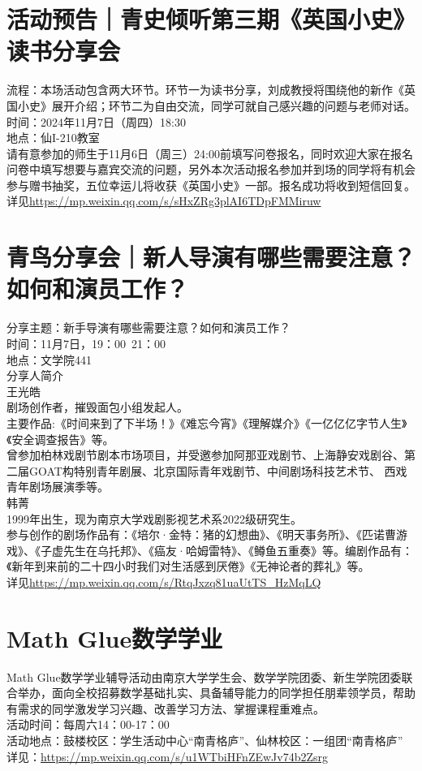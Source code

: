 \documentclass[letterpaper, 12pt]{article}
\begin{document}
\begin{multicols}{2}
\section{活动预告｜青史倾听第三期《英国小史》读书分享会}
流程：本场活动包含两大环节。环节一为读书分享，刘成教授将围绕他的新作《英国小史》展开介绍；环节二为自由交流，同学可就自己感兴趣的问题与老师对话。\\
时间：2024年11月7日（周四）18:30\\
地点：仙I-210教室\\
请有意参加的师生于11月6日（周三）24:00前填写问卷报名，同时欢迎大家在报名问卷中填写想要与嘉宾交流的问题，另外本次活动报名参加并到场的同学将有机会参与赠书抽奖，五位幸运儿将收获《英国小史》一部。报名成功将收到短信回复。详见\url{https://mp.weixin.qq.com/s/sHxZRg3plAI6TDpFMMiruw}
\section{青鸟分享会｜新人导演有哪些需要注意？如何和演员工作？}
分享主题：新手导演有哪些需要注意？如何和演员工作？\\
时间：11月7日，19：00~21：00\\
地点：文学院441\\
分享人简介\\
王光皓\\
剧场创作者，摧毁面包小组发起人。\\
主要作品:《时间来到了下半场！》《难忘今宵》《理解媒介》《一亿亿亿字节人生》《安全调查报告》等。\\
曾参加柏林戏剧节剧本市场项目，并受邀参加阿那亚戏剧节、上海静安戏剧谷、第二届GOAT构特别青年剧展、北京国际青年戏剧节、中间剧场科技艺术节、 西戏青年剧场展演季等。\\
韩菁\\
1999年出生，现为南京大学戏剧影视艺术系2022级研究生。\\
参与创作的剧场作品有：《培尔·金特：猪的幻想曲》、《明天事务所》、《匹诺曹游戏》、《子虚先生在乌托邦》、《癌友·哈姆雷特》、《鳟鱼五重奏》等。编剧作品有：《新年到来前的二十四小时我们对生活感到厌倦》《无神论者的葬礼》等。\\
详见\url{https://mp.weixin.qq.com/s/RtqJxzq81uaUtTS_HzMqLQ}\\
\section{Math Glue数学学业}
Math Glue数学学业辅导活动由南京大学学生会、数学学院团委、新生学院团委联合举办，面向全校招募数学基础扎实、具备辅导能力的同学担任朋辈领学员，帮助有需求的同学激发学习兴趣、改善学习方法、掌握课程重难点。\\
活动时间：每周六14：00-17：00\\
活动地点：鼓楼校区：学生活动中心“南青格庐”、仙林校区：一组团“南青格庐”\\
详见：\url{https://mp.weixin.qq.com/s/u1WTbiHFnZEwJv74b2Zsrg}

\end{multicols}
\end{document}
